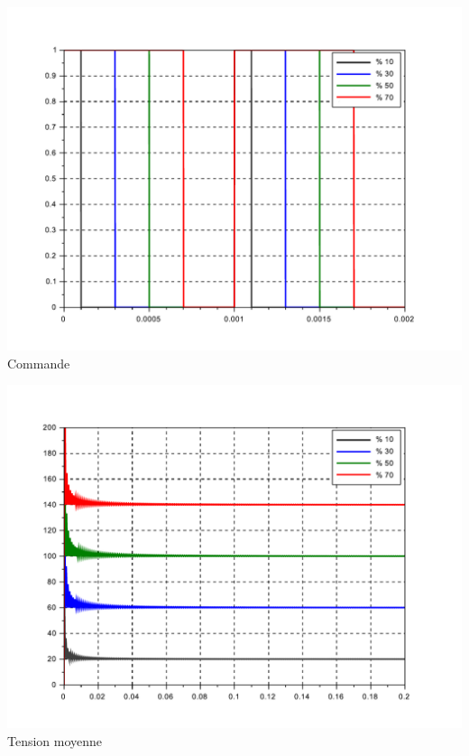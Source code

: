 {{\begin{minipage}{0.45\linewidth}
 \centering\includegraphics[width=0.9\linewidth]{img/Simu015} \\
Commande
\end{minipage}\hfill
\begin{minipage}{0.45\linewidth}
 \centering\includegraphics[width=0.9\linewidth]{img/Simu025} \\
Tension moyenne
\end{minipage}
}}


